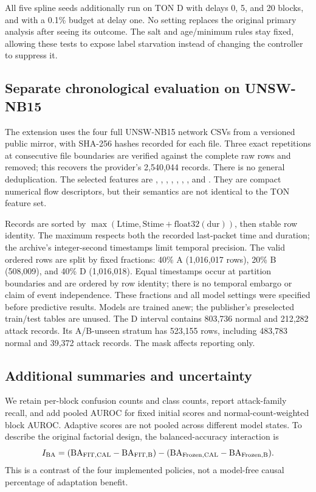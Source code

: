 All five spline seeds additionally run on TON D with delays 0, 5, and 20 blocks, and with a 0.1\% budget at delay one. No setting replaces the original primary analysis after seeing its outcome. The salt and age/minimum rules stay fixed, allowing these tests to expose label starvation instead of changing the controller to suppress it.

\subsection{Separate chronological evaluation on UNSW-NB15}
\label{sec:unswdesign}
The extension uses the four full UNSW-NB15 network CSVs from a versioned public mirror, with SHA-256 hashes recorded for each file. Three exact repetitions at consecutive file boundaries are verified against the complete raw rows and removed; this recovers the provider's 2,540,044 records. There is no general deduplication. The selected features are , , , , , , , and . They are compact numerical flow descriptors, but their semantics are not identical to the TON feature set.

Records are sorted by $\max(\mathrm{Ltime},\mathrm{Stime}+\mathrm{float32}(\mathrm{dur}))$, then stable row identity. The maximum respects both the recorded last-packet time and duration; the archive's integer-second timestamps limit temporal precision. The valid ordered rows are split by fixed fractions: 40\% A (1,016,017 rows), 20\% B (508,009), and 40\% D (1,016,018). Equal timestamps occur at partition boundaries and are ordered by row identity; there is no temporal embargo or claim of event independence. These fractions and all model settings were specified before predictive results. Models are trained anew; the publisher's preselected train/test tables are unused. The D interval contains 803,736 normal and 212,282 attack records. Its A/B-unseen stratum has 523,155 rows, including 483,783 normal and 39,372 attack records. The mask affects reporting only.

\subsection{Additional summaries and uncertainty}
We retain per-block confusion counts and class counts, report attack-family recall, and add pooled AUROC for fixed initial scores and normal-count-weighted block AUROC. Adaptive scores are not pooled across different model states. To describe the original factorial design, the balanced-accuracy interaction is
\begin{equation}
 I_{\rm BA}=(\mathrm{BA}_{\rm FIT,CAL}-\mathrm{BA}_{\rm FIT,B})
 -(\mathrm{BA}_{\rm Frozen,CAL}-\mathrm{BA}_{\rm Frozen,B}).
\end{equation}
This is a contrast of the four implemented policies, not a model-free causal percentage of adaptation benefit.


